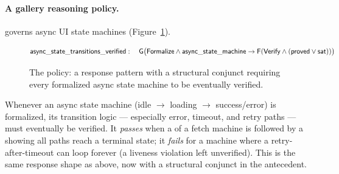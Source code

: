 \paragraph{A gallery reasoning policy.}
 governs async UI state machines
(Figure~\ref{fig:pol-async}).
\begin{figure}[H]
\centering
\small
\[ \mathsf{async\_state\_transitions\_verified}:\quad
\mathsf{G}\big(\mathsf{Formalize} \land \mathsf{async\_state\_machine} \rightarrow \mathsf{F}(\mathsf{Verify} \land (\mathsf{proved} \lor \mathsf{sat}))\big) \]
\caption{The  policy: a response pattern with a structural conjunct requiring every formalized async state machine to be eventually verified.}
\label{fig:pol-async}
\end{figure}
Whenever an async state machine (idle \(\to\) loading \(\to\) success/error) is
formalized, its transition logic --- especially error, timeout, and retry paths
--- must eventually be verified. It \emph{passes} when a  of a
fetch machine is followed by a  showing all paths reach a terminal
state; it \emph{fails} for a machine where a retry-after-timeout can loop forever
(a liveness violation left unverified). This is the same response shape as above,
now with a structural conjunct in the antecedent.

